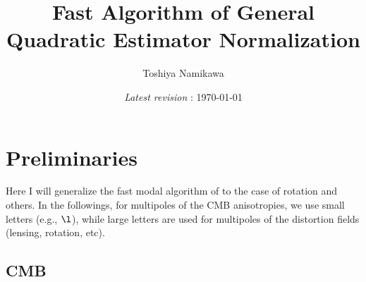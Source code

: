 \documentclass{article}
\begin{document}
\title{Fast Algorithm of General Quadratic Estimator Normalization}

\author{Toshiya Namikawa}

\date{{\it Latest revision} : \today}


\maketitle

\tableofcontents


\section{Preliminaries} 

Here I will generalize the fast modal algorithm of \cite{Dvorkin:2009ah,Smith:2010gu} 
to the case of rotation and others. 
In the followings, for multipoles of the CMB anisotropies, we use small letters (e.g., $\l$), 
while large letters are used for multipoles of the distortion fields (lensing, rotation, etc). 

\subsection{CMB} 
\end{document}
